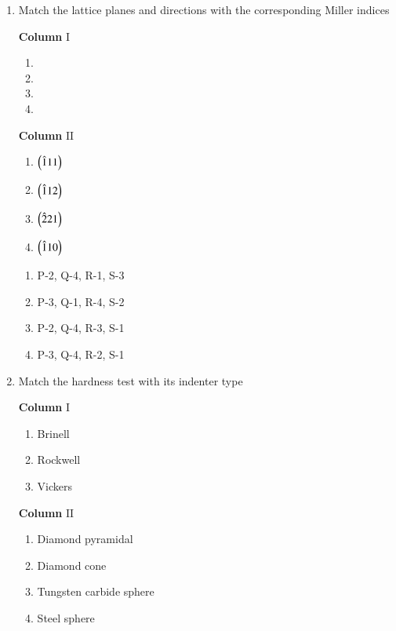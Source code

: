 \documentclass[journal]{IEEEtran}
\numberwithin{equation}{enumi}
\numberwithin{figure}{enumi}
\begin{document}
\begin{enumerate}
	\item Match the lattice planes and directions  with the corresponding Miller indices 
		\begin{multicols}{2}
			\textbf{Column} $\mathrm{I}$
			\begin{enumerate}
				\item[P]
				\item[Q]
				\item[R]
				\item[S]
			\end{enumerate}
			\columnbreak
			\textbf{Column} $\mathrm{II}$
			\begin{enumerate}
				\item[1] $\left(\hat{1}11\right)$
				\item[2] $\left(\hat{1}12\right)$
				\item[3] $\left(\hat{2}21\right)$
				\item[4] $\left(\hat{1}10\right)$
			\end{enumerate}
		\end{multicols}
		\begin{enumerate}
			\item P-2, Q-4, R-1, S-3 
			\item P-3, Q-1, R-4, S-2
			\item P-2, Q-4, R-3, S-1
			\item P-3, Q-4, R-2, S-1
		\end{enumerate}

	\item Match the hardness test  with its indenter type \brak{\text{in Column }\mathrm{II}}
		\begin{multicols}{2}
			\textbf{Column} $\mathrm{I}$
			\begin{enumerate}
				\item [P] Brinell
				\item [Q] Rockwell
				\item [R] Vickers
			\end{enumerate}
			\columnbreak
			\textbf{Column} $\mathrm{II}$
			\begin{enumerate}
				\item[1] Diamond pyramidal
				\item[2] Diamond cone
				\item[3] Tungsten carbide sphere
				\item[4] Steel sphere
			\end{enumerate}
		\end{multicols}


\end{enumerate}
\end{document}
